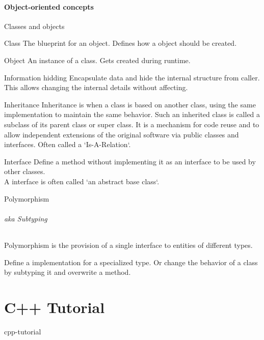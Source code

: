 \documentclass{beamer}
\begin{document}
\subsection{Object-oriented concepts}

\begin{frame}{Classes and objects}

\begin{block}{Class}
The blueprint for an object. Defines how a object should be created.
\end{block}

\begin{block}{Object}
An instance of a class. Gets created during runtime.
\end{block}

\end{frame}

\begin{frame}{Information hidding}
Encapsulate data and hide the internal structure from caller. This allows
changing the internal details without affecting.
\end{frame}

\begin{frame}{Inheritance}
Inheritance is when a class is based on another class, using the same
implementation to maintain the same behavior.
Such an inherited class is called a subclass of its parent class or super class.
It is a mechanism for code reuse and to allow independent extensions of the
original software via public classes and interfaces.
 Often called a `Is-A-Relation`.
\end{frame}

\begin{frame}{Interface}
Define a method without implementing it as an interface to be used by other
classes. \\
A interface is often called `an abstract base class`.
\end{frame}

\begin{frame}{Polymorphism}
\framesubtitle{aka Subtyping}
Polymorphism is the provision of a single interface to entities of different
types.

Define a implementation for a specialized type. Or change the behavior of a
class by subtyping it and overwrite a method.
\end{frame}

\part{C++ Tutorial}{cpp-tutorial}
\end{document}
